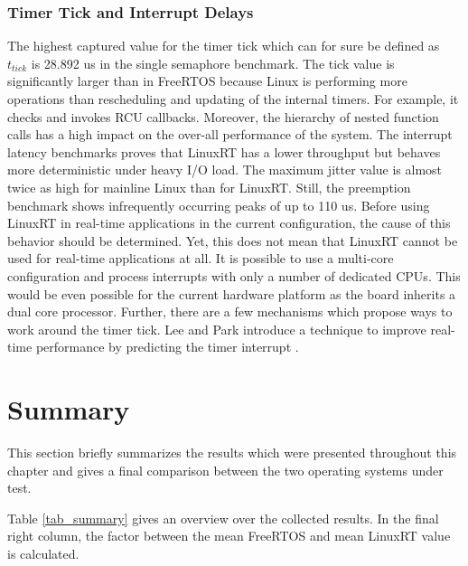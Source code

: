 \subsubsection{Timer Tick and Interrupt Delays}
The highest captured value for the timer tick which can for sure be defined as $t_{tick}$ is 28.892 us in the single semaphore benchmark.
The tick value is significantly larger than in FreeRTOS because Linux is performing more operations than rescheduling and updating of the internal timers. 
For example, it checks and invokes \ac{RCU} callbacks.
Moreover, the hierarchy of nested function calls has a high impact on the over-all performance of the system. 
The interrupt latency benchmarks proves that LinuxRT has a lower throughput but behaves more deterministic under heavy \ac{I/O} load. 
The maximum jitter value is almost twice as high for mainline Linux than for LinuxRT.
Still, the preemption benchmark shows infrequently occurring peaks of up to 110 us. 
Before using LinuxRT in real-time applications in the current configuration, the cause of this behavior should be determined.
Yet, this does not mean that LinuxRT cannot be used for real-time applications at all.
It is possible to use a multi-core configuration and process interrupts with only a number of dedicated \acp{CPU}.
This would be even possible for the current hardware platform as the board inherits a dual core processor.
Further, there are a few mechanisms which propose ways to work around the timer tick.
Lee and Park introduce a technique to improve real-time performance by predicting the timer interrupt \cite{lee:dltfirtpoelbpoti}.

\section{Summary}\label{s_summary}
This section briefly summarizes the results which were presented throughout this chapter and gives a final comparison between the two operating systems under test.
\par
Table \ref{tab_summary} gives an overview over the collected results.
In the final right column, the factor between the mean FreeRTOS and mean LinuxRT value is calculated. 

